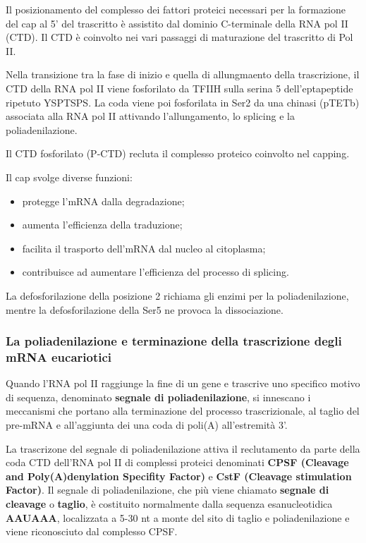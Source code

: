 \documentclass[]{article}
\begin{document}
Il posizionamento del complesso dei fattori proteici necessari per la
formazione del cap al 5' del trascritto è assistito dal dominio
C-terminale della RNA pol II (CTD). Il CTD è coinvolto nei vari passaggi
di maturazione del trascritto di Pol II.

Nella transizione tra la fase di inizio e quella di allungmaento della
trascrizione, il CTD della RNA pol II viene fosforilato da TFIIH sulla
serina 5 dell'eptapeptide ripetuto YSPTSPS. La coda viene poi
fosforilata in Ser2 da una chinasi (pTETb) associata alla RNA pol II
attivando l'allungamento, lo splicing e la poliadenilazione.

Il CTD fosforilato (P-CTD) recluta il complesso proteico coinvolto nel
capping.

Il cap svolge diverse funzioni:

\begin{itemize}
\itemsep1pt\parskip0pt
\item
  protegge l'mRNA dalla degradazione;
\item
  aumenta l'efficienza della traduzione;
\item
  facilita il trasporto dell'mRNA dal nucleo al citoplasma;
\item
  contribuisce ad aumentare l'efficienza del processo di splicing.
\end{itemize}

La defosforilazione della posizione 2 richiama gli enzimi per la
poliadenilazione, mentre la defosforilazione della Ser5 ne provoca la
dissociazione.

\subsubsection{La poliadenilazione e terminazione della trascrizione
degli mRNA
eucariotici}\label{la-poliadenilazione-e-terminazione-della-trascrizione-degli-mrna-eucariotici}

Quando l'RNA pol II raggiunge la fine di un gene e trascrive uno
specifico motivo di sequenza, denominato \textbf{segnale di
poliadenilazione}, si innescano i meccanismi che portano alla
terminazione del processo trascrizionale, al taglio del pre-mRNA e
all'aggiunta dei una coda di poli(A) all'estremità 3'.

La trascrizone del segnale di poliadenilazione attiva il reclutamento da
parte della coda CTD dell'RNA pol II di complessi proteici denominati
\textbf{CPSF (Cleavage and Poly(A)denylation Specifity Factor)} e
\textbf{CstF (Cleavage stimulation Factor)}. Il segnale di
poliadenilazione, che più viene chiamato \textbf{segnale di cleavage} o
\textbf{taglio}, è costituito normalmente dalla sequenza esanucleotidica
\textbf{AAUAAA}, localizzata a 5-30 nt a monte del sito di taglio e
poliadenilazione e viene riconosciuto dal complesso CPSF.
\end{document}
